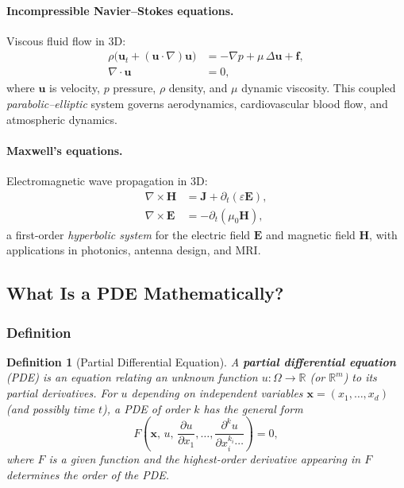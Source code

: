 \documentclass[11pt]{article}
\newtheorem{definition}[theorem]{Definition}
\newcommand{\R}{\mathbb{R}}
\newcommand{\domain}{\Omega}
\begin{document}
\paragraph{Incompressible Navier--Stokes equations.}
Viscous fluid flow in 3D:
\begin{align*}
  \rho\bigl(\mathbf{u}_t + (\mathbf{u}\cdot\nabla)\mathbf{u}\bigr)
    &= -\nabla p + \mu\,\Delta\mathbf{u} + \mathbf{f}, \\
  \nabla\cdot\mathbf{u} &= 0,
\end{align*}
where $\mathbf{u}$ is velocity, $p$ pressure, $\rho$ density, and $\mu$
dynamic viscosity.
This coupled \emph{parabolic--elliptic} system governs aerodynamics,
cardiovascular blood flow, and atmospheric dynamics.

\paragraph{Maxwell's equations.}
Electromagnetic wave propagation in 3D:
\begin{align*}
  \nabla\times\mathbf{H} &= \mathbf{J} + \partial_t(\varepsilon\mathbf{E}),\\
  \nabla\times\mathbf{E} &= -\partial_t(\mu_0\mathbf{H}),
\end{align*}
a first-order \emph{hyperbolic system} for the electric field $\mathbf{E}$
and magnetic field $\mathbf{H}$, with applications in photonics, antenna
design, and MRI.

\subsection{What Is a PDE Mathematically?}
\label{subsec:pde-definition}

\subsubsection{Definition}

\begin{definition}[Partial Differential Equation]
A \textbf{partial differential equation} (PDE) is an equation relating an
unknown function $u \colon \domain \to \R$ (or $\R^m$) to its partial
derivatives.
For $u$ depending on independent variables
$\mathbf{x} = (x_1, \dots, x_d)$ (and possibly time $t$), a PDE of
\emph{order $k$} has the general form
\begin{equation}
  \label{eq:pde-general}
  F\!\left(\mathbf{x},\, u,\, \frac{\partial u}{\partial x_1},\dots,
    \frac{\partial^k u}{\partial x_i^{k_i}\cdots}\right) = 0,
\end{equation}
where $F$ is a given function and the highest-order derivative appearing in
$F$ determines the \emph{order} of the PDE.
\end{definition}
\end{document}
